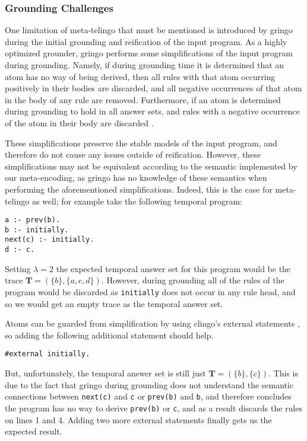 \subsubsection{Grounding Challenges}

One limitation of meta-telingo that must be mentioned is introduced by
gringo during the initial grounding and reification of the input
program. As a highly optimized grounder, gringo performs some
simplifications of the input program during grounding. Namely, if
during grounding time it is determined that an atom has no way of
being derived, then all rules with that atom occurring positively in
their bodies are discarded, and all negative occurrences of that atom
in the body of any rule are removed. Furthermore, if an atom is
determined during grounding to hold in all answer sets, and rules with
a negative occurrence of the atom in their body are discarded \cite{gekakasc12a}.

These simplifications preserve the stable models of the input program,
and therefore do not cause any issues outside of reification. However,
these simplifications may not be equivalent according to the semantic
implemented by our meta-encoding, as gringo has no knowledge of these
semantics when performing the aforementioned simplifications. Indeed,
this is the case for meta-telingo as well; for example take the
following temporal program:

\begin{lstlisting}[language=clingo]
a :- prev(b).
b :- initially.
next(c) :- initially.
d :- c.
\end{lstlisting}

Setting $\lambda=2$ the expected temporal answer set for this program
would be the trace $\bm{T}=(\{ b \},\{ a, c, d \})$. However, during
grounding all of the rules of the program would be discarded as
\verb|initially| does not occur in any rule head, and so we would get
an empty trace as the temporal answer set.

Atoms can be guarded from simplification by using clingo's external
statements \cite{PotasscoUserGuide19}, so adding the following
additional statement should help.

\begin{lstlisting}[language=clingo,numbers=none]
#external initially.
\end{lstlisting}

But, unfortunately, the temporal answer set is still just
$\bm{T}=(\{ b \},\{ c \})$. This is due to the fact that gringo during
grounding does not understand the semantic connections between
\verb|next(c)| and \verb|c| or \verb|prev(b)| and \verb|b|, and
therefore concludes the program has no way to derive \verb|prev(b)| or
\verb|c|, and as a result discards the rules on lines 1 and 4. Adding
two more external statements finally gets us the expected result.

